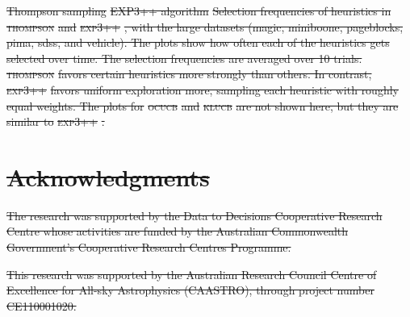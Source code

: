 \documentclass[fleqn,10pt,lineno]{wlpeerj} %
\providecommand{\DIFdeltex}[1]{{\protect\color{red}\sout{#1}}}                      %
\providecommand{\DIFdelFL}[1]{\DIFdel{#1}} %
\providecommand{\DIFdel}[1]{\texorpdfstring{\DIFdeltex{#1}}{}} %
\begin{document}
{%
\DIFdelFL{Thompson sampling}}
{%
\DIFdelFL{EXP3++ algorithm}}
{%
\DIFdelFL{Selection frequencies of
	heuristics in }\textsc{\DIFdelFL{thompson}} %
\DIFdelFL{and }\textsc{\DIFdelFL{exp3++}}%
\DIFdelFL{, with the large
	datasets (magic, miniboone, pageblocks, pima, sdss, and vehicle). The plots
	show how often each of the heuristics gets selected over time. The
	selection frequencies are averaged over 10 trials. }\textsc{\DIFdelFL{thompson}} %
\DIFdelFL{favors
	certain heuristics more strongly than others. In contrast, }\textsc{\DIFdelFL{exp3++}}
\DIFdelFL{favors uniform exploration more, sampling each heuristic with roughly equal
	weights. The plots for }\textsc{\DIFdelFL{ocucb}} %
\DIFdelFL{and }\textsc{\DIFdelFL{klucb}} %
\DIFdelFL{are not shown
	here, but they are similar to }\textsc{\DIFdelFL{exp3++}}%
\DIFdelFL{.}}

\section{\DIFdel{Acknowledgments}}
\addtocounter{section}{-1}%

\DIFdel{The research was supported by the Data to Decisions Cooperative Research
Centre whose activities are funded by the Australian Commonwealth Government’s
Cooperative Research Centres Programme.
}%

\DIFdel{This research was supported by the Australian Research Council Centre of
Excellence for All-sky Astrophysics (CAASTRO), through project number
CE110001020.
}%
\end{document}
